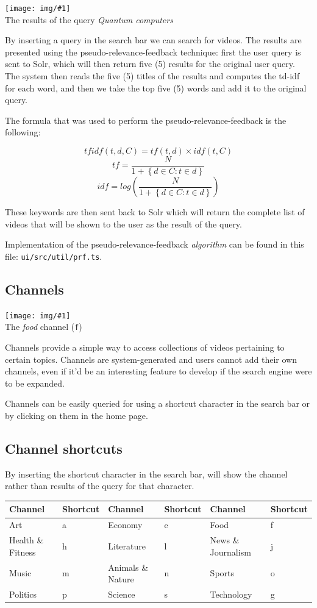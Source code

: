 \documentclass[12pt]{exam}
\newcommand{\lp}{\left(}
\newcommand{\rp}{\right)}
\newcommand{\pic}[2]{{
\begin{center}
\texttt{[image: img/\#1]} \\
{#2}
\end{center}
}}
\begin{document}
\pic{se_query}{The results of the query \textit{Quantum computers}}

By inserting a query in the search bar we can search for videos.
The results are presented using the pseudo-relevance-feedback technique:
first the user query is sent to Solr, which will then return five (5) 
results for the original user query. The system then reads the five (5)
titles of the results and computes the td-idf for each word, and then we take
the top five (5) words and add it to the original query.

The formula that was used to perform the pseudo-relevance-feedback is the
following:

$$
tfidf \lp t, d, C \rp = tf \lp t, d \rp \times idf \lp t, C \rp
$$
$$
tf = \dfrac{N}{1 + \left\{ d \in C : t \in d \right\}}
$$
$$
idf = log \lp \dfrac{N}{1 + \left\{ d \in C : t \in d \right\}} \rp
$$

These keywords are then sent back to Solr which will return the complete list
of videos that will be shown to the user as the result of the query.

Implementation of the pseudo-relevance-feedback \textit{algorithm} can be
found in this file: \texttt{ui/src/util/prf.ts}.

\subsection{Channels}

\pic{se_channel}{The \textit{food} channel (\texttt{f})}

Channels provide a simple way to access collections of videos pertaining
to certain topics. Channels are system-generated and users cannot add
their own channels, even if it'd be an interesting feature to develop if
the search engine were to be expanded.

Channels can be easily queried for using a shortcut character in the search
bar or by clicking on them in the home page.

\subsection*{Channel shortcuts}

By inserting the shortcut character in the search bar, will show the channel
rather than results of the query for that character.

\begin{center}
\begin{tabular}{ll|ll|ll}
Channel & Shortcut & Channel & Shortcut & Channel & Shortcut \\\hline
Art               & a & Economy           & e & Food               & f \\
Health \& Fitness & h & Literature        & l & News \& Journalism & j \\
Music             & m & Animals \& Nature & n & Sports             & o \\
Politics          & p & Science           & s & Technology         & g \\
\end{tabular}
\end{center}
\end{document}
